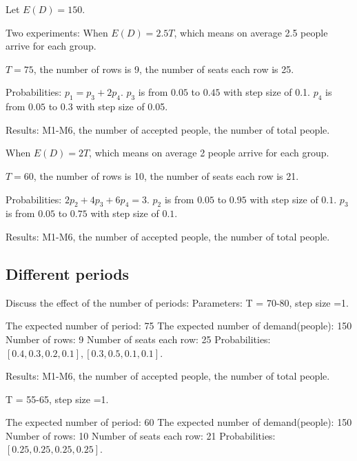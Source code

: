 


\newpage

Let $E(D) = 150$.

Two experiments:
When $E(D) = 2.5T$, which means on average 2.5 people arrive for each group.

$T =75$, the number of rows is 9, the number of seats each row is 25.

Probabilities: 
$p_1 = p_3 + 2p_4$. $p_3$ is from $0.05$ to $0.45$ with step size of 0.1. $p_4$ is from $0.05$ to $0.3$ with step size of 0.05.

Results: M1-M6, the number of accepted people, the number of total people.

% 

When $E(D) = 2T$, which means on average 2 people arrive for each group.

$T = 60$, the number of rows is 10, the number of seats each row is 21.

Probabilities: 
$2p_2 + 4p_3 + 6p_4 =3$. $p_2$ is from $0.05$ to $0.95$ with step size of $0.1$. $p_3$ is from $0.05$ to $0.75$ with step size of $0.1$.

Results: M1-M6, the number of accepted people, the number of total people.

% 

\subsection{Different periods}
Discuss the effect of the number of periods: 
Parameters: T = 70-80, step size =1.

The expected number of period: 75
The expected number of demand(people): 150
Number of rows: 9
Number of seats each row: 25
Probabilities: $[0.4, 0.3, 0.2, 0.1], [0.3, 0.5, 0.1, 0.1]$.

Results: M1-M6, the number of accepted people, the number of total people.

% 

% 

T = 55-65, step size =1.

The expected number of period: 60
The expected number of demand(people): 150
Number of rows: 10
Number of seats each row: 21
Probabilities: $[0.25, 0.25, 0.25, 0.25]$.

